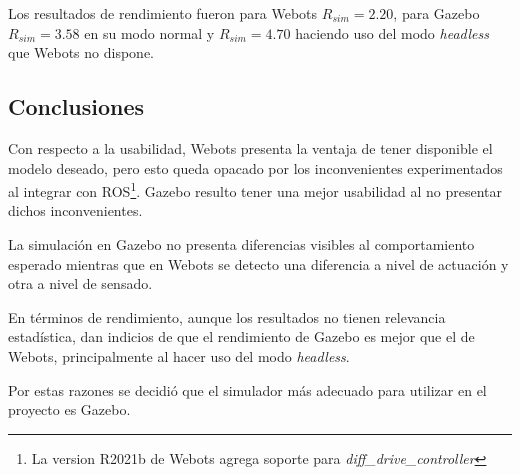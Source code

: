 Los resultados de rendimiento fueron para Webots $R_{sim}=2.20$, para Gazebo $R_{sim}=3.58$
en su modo normal y $R_{sim}=4.70$ haciendo uso del modo \emph{headless} que Webots no dispone.

\subsection{Conclusiones}

Con respecto a la usabilidad, Webots presenta la ventaja de tener
disponible el modelo deseado, pero esto queda opacado por los inconvenientes
experimentados al integrar con \gls{ROS}\footnote{La version R2021b de
Webots agrega soporte para \emph{diff\_drive\_controller}}. Gazebo resulto tener una mejor usabilidad al no presentar dichos
inconvenientes.

La simulación en Gazebo no presenta diferencias visibles al comportamiento
esperado mientras que en Webots se detecto una diferencia a nivel de actuación
y otra a nivel de sensado.

En términos de rendimiento, aunque los resultados no tienen relevancia estadística,
dan indicios de que el rendimiento de Gazebo es mejor que el de Webots,
principalmente al hacer uso del modo \emph{headless}.

Por estas razones se decidió que el simulador más adecuado para utilizar en el
proyecto es Gazebo.
